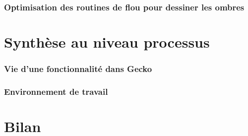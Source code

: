 \documentclass[a4paper,10pt]{article}
\begin{document}
\begin{multicols}{2}
  \section{Optimisation des routines de flou pour dessiner les ombres}
  \part{Synthèse au niveau processus}
  \section{Vie d'une fonctionnalité dans Gecko}
  \section{Environnement de travail}
  \part{Bilan}

%
%

\end{multicols}
\end{document}
